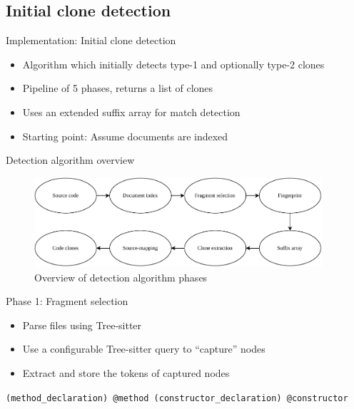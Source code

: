 \documentclass[aspectratio=1610, xcolor=table]{beamer}
\begin{document}
\subsection{Initial clone detection}

\begin{frame}{Implementation: Initial clone detection}
    \begin{itemize}
        \item Algorithm which initially detects type-1 and optionally type-2 clones
        \item Pipeline of 5 phases, returns a list of clones
        \item Uses an extended suffix array for match detection
        \item Starting point: Assume documents are indexed
    \end{itemize}
\end{frame}

\begin{frame}{Detection algorithm overview}
    \begin{figure}
        \begin{center}
            \includegraphics[width=0.95\textwidth]{figures/phases_all.drawio.pdf}
        \end{center}
        \caption{Overview of detection algorithm phases}
    \end{figure}
\end{frame}

\begin{frame}[fragile]{Phase 1: Fragment selection}
    \begin{itemize}
        \item Parse files using Tree-sitter
        \item Use a configurable Tree-sitter query to ``capture'' nodes
        \item Extract and store the tokens of captured nodes
    \end{itemize}
    \vspace{1cm}
    \begin{center}
        \verb|(method_declaration) @method (constructor_declaration) @constructor|
    \end{center}
\end{frame}
\end{document}

